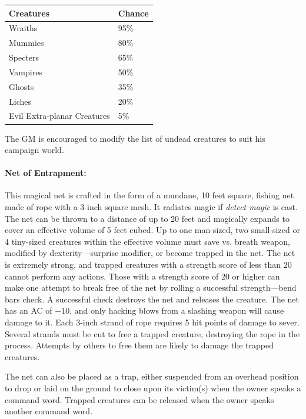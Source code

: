 \begin{multicols}{2}
\noindent \begin{tabular}{|p{}|p{}|}
\hline
Creatures	& Chance \\
\hline\hline
\rowcolor[gray]{0.9}Wraiths	& 95\% \\
Mummies	& 80\% \\
\rowcolor[gray]{0.9}Specters	& 65\% \\
Vampires	& 50\% \\
\rowcolor[gray]{0.9}Ghosts	& 35\% \\
Liches	& 20\% \\
\rowcolor[gray]{0.9}Evil Extra-planar Creatures	& 5\% \\
\hline
\end{tabular}

The GM is encouraged to modify the list of undead creatures to suit his campaign world.

\paragraph{Net of Entrapment:} This magical net is crafted in the form of a mundane, 10 feet square, fishing net made of rope with a 3-inch square mesh.  It radiates magic if \textit{detect magic} is cast.  The net can be thrown to a distance of up to 20 feet and magically expands to cover an effective volume of 5 feet cubed.  Up to one man-sized, two small-sized or 4 tiny-sized creatures within the effective volume must save vs. breath weapon, modified by dexterity---surprise modifier, or become trapped in the net.  The net is extremely strong, and trapped creatures with a strength score of less than 20 cannot perform any actions.  Those with a strength score of 20 or higher can make one attempt to break free of the net by rolling a successful strength---bend bars check.  A successful check destroys the net and releases the creature.  The net has an AC of $-10$, and only hacking blows from a slashing weapon will cause damage to it.  Each 3-inch strand of rope requires 5 hit points of damage to sever.  Several strands must be cut to free a trapped creature, destroying the rope in the process.  Attempts by others to free them are likely to damage the trapped creatures.

The net can also be placed as a trap, either suspended from an overhead position to drop or laid on the ground to close upon its victim(s) when the owner speaks a command word.  Trapped creatures can be released when the owner speaks another command word.


\end{multicols}
